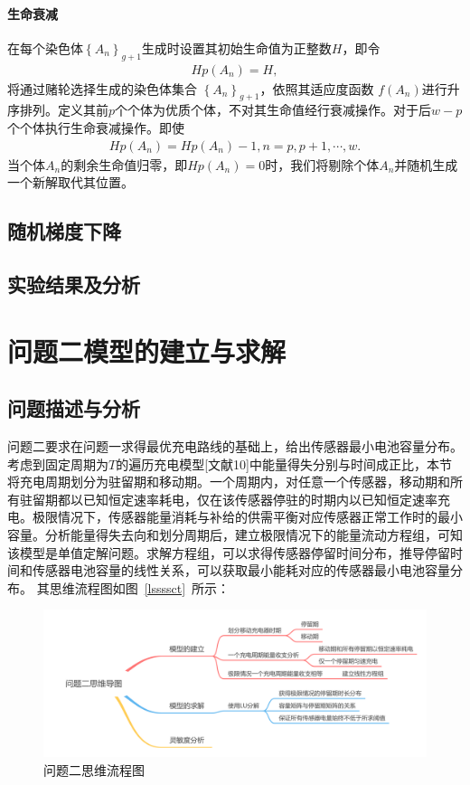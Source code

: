\documentclass{whutmod}
\begin{document}
		\paragraph{生命衰减}
		在每个染色体$\left \{A_n  \right \}_{g+1}$生成时设置其初始生命值为正整数$H$，即令
	\begin{gather}
	Hp(A_n)=H,
	\end{gather}
	将通过赌轮选择生成的染色体集合 $\left \{A_n  \right \}_{g+1}$，依照其适应度函数
	$f(A_n)$进行升序排列。定义其前$p$个个体为优质个体，不对其生命值经行衰减操作。对于后$w-p$个个体执行生命衰减操作。即使
		\begin{gather}
		Hp(A_n)=Hp(A_n)-1,n=p,p+1,\cdots,w.
		\end{gather}
    当个体$A_n$的剩余生命值归零，即$Hp(A_n)=0$时，我们将剔除个体$A_n$并随机生成一个新解取代其位置。
	\subsection{随机梯度下降}	
    
		
		
		
		
		

		
        \subsection{实验结果及分析}
  
	\section{问题二模型的建立与求解}
		\subsection{问题描述与分析}

			问题二要求在问题一求得最优充电路线的基础上，给出传感器最小电池容量分布。考虑到固定周期为$T$的遍历充电模型[文献10]中能量得失分别与时间成正比，本节将充电周期划分为驻留期和移动期。一个周期内，对任意一个传感器，移动期和所有驻留期都以已知恒定速率耗电，仅在该传感器停驻的时期内以已知恒定速率充电。极限情况下，传感器能量消耗与补给的供需平衡对应传感器正常工作时的最小容量。分析能量得失去向和划分周期后，建立极限情况下的能量流动方程组，可知该模型是单值定解问题。求解方程组，可以求得传感器停留时间分布，推导停留时间和传感器电池容量的线性关系，可以获取最小能耗对应的传感器最小电池容量分布。
			其思维流程图如图~\ref{lssssct}~所示：
			
			\begin{figure}[H]
				\centering
				\includegraphics[width=\textwidth]{figures/222222.png}
				\caption{问题二思维流程图}\label{ssssct}
			\end{figure}
		
\end{document}
